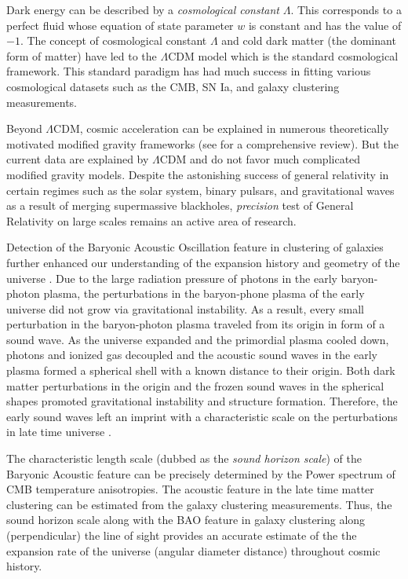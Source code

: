 Dark energy can be described by a \emph{cosmological constant} $\Lambda$. 
This corresponds to a perfect fluid whose equation of state parameter $w$ is 
constant and has the value of $-1$. The concept of cosmological constant $\Lambda$ and 
cold dark matter (the dominant form of matter) have led to the $\Lambda$CDM model which is 
the standard cosmological framework. This standard paradigm has had much success in 
fitting various cosmological datasets such as the CMB, SN Ia, and galaxy clustering 
measurements.

Beyond $\Lambda$CDM, cosmic acceleration 
can be explained in numerous theoretically motivated modified gravity frameworks (see \citealt{bull2016} 
for a comprehensive review). But the current data are explained by $\Lambda$CDM and do not favor 
much complicated modified gravity models. 
Despite the astonishing success of general relativity in 
certain regimes such as the solar system, binary pulsars, 
and gravitational waves as a result of merging supermassive blackholes, 
\emph{precision} test of General Relativity on large scales remains an active area of research. 

Detection of the Baryonic Acoustic Oscillation feature in clustering of galaxies 
further enhanced our understanding of the expansion history and geometry of the universe \citep{cole2005,eisenstein2005}.
Due to the large radiation pressure of photons in the early baryon-photon plasma, the perturbations in the 
baryon-phone plasma of the early universe did not grow via gravitational instability. As a result, every small perturbation 
in the baryon-photon plasma traveled from its origin in form of a sound wave. 
As the universe expanded and the primordial plasma cooled down, 
photons and ionized gas decoupled and the acoustic sound waves in the early plasma formed a spherical shell 
with a known distance to their origin. Both dark matter perturbations in the origin and the frozen sound waves in 
the spherical shapes promoted gravitational instability and structure formation. Therefore, the early sound waves left an 
imprint with a characteristic scale on the perturbations in late time universe \citep{eisenstein1998,weinberg2013}.  

The characteristic length scale (dubbed as the \emph{sound horizon scale}) of the 
Baryonic Acoustic feature can be precisely determined by the Power spectrum 
of CMB temperature anisotropies. The acoustic feature in the late time matter clustering can be estimated from 
the galaxy clustering measurements. Thus, the sound horizon scale along with the BAO feature in 
galaxy clustering along (perpendicular) the line of sight provides an accurate estimate 
of the the expansion rate of the universe (angular diameter distance) throughout cosmic history.

